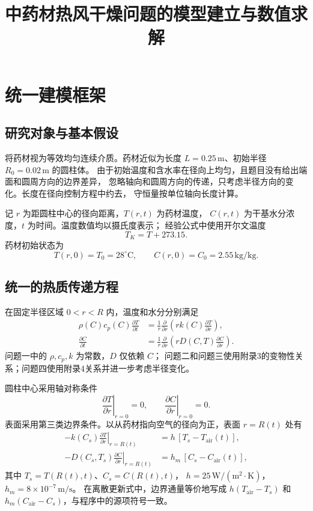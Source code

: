 \documentclass[UTF8,a4paper,11pt]{ctexart}
\title{中药材热风干燥问题的模型建立与数值求解}
\author{}
\date{}
\numberwithin{equation}{section}
\begin{document}
\maketitle
\tableofcontents
\newpage

\section{统一建模框架}

\subsection{研究对象与基本假设}

将药材视为等效均匀连续介质。药材近似为长度
\(L=0.25\,\mathrm{m}\)、初始半径 \(R_0=0.02\,\mathrm{m}\) 的圆柱体。
由于初始温度和含水率在径向上均匀，且题目没有给出端面和圆周方向的边界差异，
忽略轴向和圆周方向的传递，只考虑半径方向的变化。长度在径向控制方程中约去，
守恒量按单位轴向长度计算。

记 \(r\) 为距圆柱中心的径向距离，\(T(r,t)\) 为药材温度，
\(C(r,t)\) 为干基水分浓度，\(t\) 为时间。温度数值均以摄氏度表示；
经验公式中使用开尔文温度
\[
T_K=T+273.15.
\]
药材初始状态为
\[
T(r,0)=T_0=28^\circ\mathrm{C},\qquad
C(r,0)=C_0=2.55\,\mathrm{kg/kg}.
\]

\subsection{统一的热质传递方程}

在固定半径区域 \(0<r<R\) 内，温度和水分分别满足
\begin{align}
\rho(C)c_p(C)\frac{\partial T}{\partial t}
&=\frac{1}{r}\frac{\partial}{\partial r}
\left(rk(C)\frac{\partial T}{\partial r}\right), \label{eq:common-T}\\
\frac{\partial C}{\partial t}
&=\frac{1}{r}\frac{\partial}{\partial r}
\left(rD(C,T)\frac{\partial C}{\partial r}\right). \label{eq:common-C}
\end{align}
问题一中的 \(\rho,c_p,k\) 为常数，\(D\) 仅依赖 \(C\)；
问题二和问题三使用附录3的变物性关系；问题四使用附录4关系并进一步考虑半径变化。

圆柱中心采用轴对称条件
\begin{equation}
\left.\frac{\partial T}{\partial r}\right|_{r=0}=0,\qquad
\left.\frac{\partial C}{\partial r}\right|_{r=0}=0. \label{eq:center-bc}
\end{equation}
表面采用第三类边界条件。以从药材指向空气的径向为正，表面 \(r=R(t)\) 处有
\begin{align}
-k(C_s)\left.\frac{\partial T}{\partial r}\right|_{r=R(t)}
&=h\,[T_s-T_{\mathrm{air}}(t)], \label{eq:surface-T}\\
-D(C_s,T_s)\left.\frac{\partial C}{\partial r}\right|_{r=R(t)}
&=h_m\,[C_s-C_{\mathrm{air}}(t)], \label{eq:surface-C}
\end{align}
其中 \(T_s=T(R(t),t)\)、\(C_s=C(R(t),t)\)，
\(h=25\,\mathrm{W/(m^2\cdot K)}\)，
\(h_m=8\times10^{-7}\,\mathrm{m/s}\)。
在离散更新式中，边界通量等价地写成
\(h(T_{\mathrm{air}}-T_s)\) 和
\(h_m(C_{\mathrm{air}}-C_s)\)，与程序中的源项符号一致。
\end{document}
